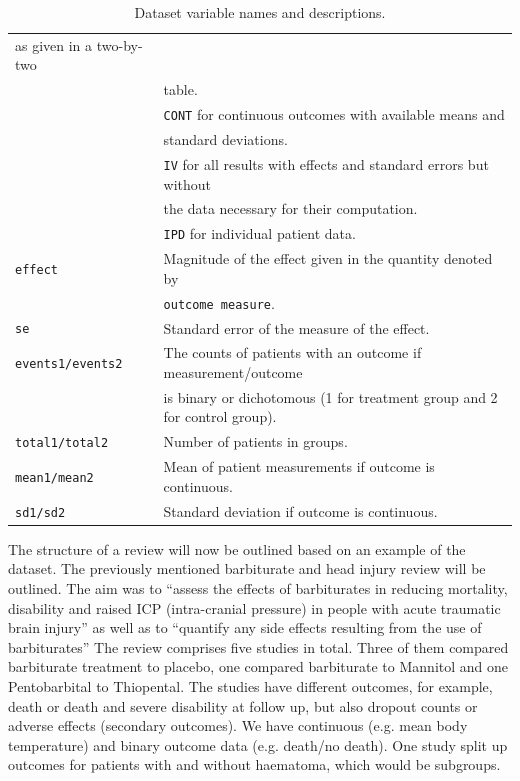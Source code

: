 \documentclass[11pt,a4paper,twoside]{book}\usepackage[]{graphicx}\usepackage[]{color}
\begin{document}
\begin{table}[ht]
\begin{center}
\begin{tabular}{ll}
      as given in a two-by-two \\ &table. \\ &\texttt{CONT} for continuous outcomes with available means and \\ &standard deviations. \\ & \texttt{IV} for all results with effects and standard errors but without \\ & the data necessary for their computation. \\ &\texttt{IPD} for individual patient data.\\
      \texttt{effect} & Magnitude of the effect given in the quantity denoted by \\ &\texttt{outcome measure}.\\
      \texttt{se} & Standard error of the measure of the effect.\\
      \texttt{events1/events2} & The counts of patients with an outcome if measurement/outcome \\ &is binary or dichotomous (1 for treatment group and 2 for control group).\\
      \texttt{total1/total2} & Number of patients in groups.\\
      \texttt{mean1/mean2} & Mean of patient measurements if outcome is continuous.\\
      \texttt{sd1/sd2} & Standard deviation if outcome is continuous.
    \end{tabular}
  \caption{Dataset variable names and descriptions.}
  \label{variable}
  \end{center}
\end{table}

\vspace{0mm}
The structure of a review will now be outlined based on an example of the dataset. The previously mentioned barbiturate and head injury review will be outlined. The aim was to ``assess the effects of barbiturates in reducing mortality, disability and raised ICP (intra-cranial pressure) in people with acute traumatic brain injury'' as well as to ``quantify any side effects resulting from the use of barbiturates'' %
The review comprises five studies in total. Three of them compared barbiturate treatment to placebo, one compared barbiturate to Mannitol and one Pentobarbital to Thiopental. The studies have different outcomes, for example, death or death and severe disability at follow up, but also dropout counts or adverse effects (secondary outcomes).
We have continuous (e.g. mean body temperature) and binary outcome data (e.g. death/no death). One study split up outcomes for patients with and without haematoma, which would be subgroups. %
\end{document}
